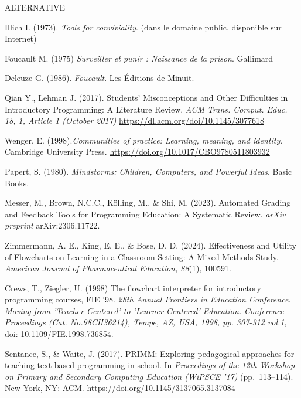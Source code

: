 \documentclass[11pt,a4paper]{article}
\begin{document}
\clearpage
ALTERNATIVE
\begin{thebibliography}{99}

 Illich I. (1973). \textit{Tools for conviviality}. (dans le domaine public, disponible sur Internet)

 Foucault M. (1975)  \textit{Surveiller et punir : Naissance de la prison}.  Gallimard

 Deleuze G. (1986). \textit{Foucault}. Les Éditions de Minuit.

Qian Y., Lehman J. (2017). Students’ Misconceptions and Other Difficulties in Introductory Programming: A Literature Review. \textit{ACM Trans. Comput. Educ. 18, 1, Article 1 (October 2017)} \url{https://dl.acm.org/doi/10.1145/3077618}

Wenger, E. (1998).\textit{Communities of practice: Learning, meaning, and identity}. Cambridge University Press. \url{https://doi.org/10.1017/CBO9780511803932}

 Papert, S. (1980). \textit{Mindstorms: Children, Computers, and Powerful Ideas}. Basic Books.

Messer, M., Brown, N.C.C., Kölling, M., \& Shi, M. (2023). Automated Grading 
and Feedback Tools for Programming Education: A Systematic Review. \textit{arXiv preprint} 
arXiv:2306.11722.

 Zimmermann, A. E., King, E. E., \& Bose, D. D. (2024). Effectiveness 
and Utility of Flowcharts on Learning in a Classroom Setting: A Mixed-Methods Study. 
\textit{American Journal of Pharmaceutical Education, 88}(1), 100591.


Crews, T., Ziegler, U. (1998) The flowchart interpreter for introductory programming courses, FIE '98. \textit{28th Annual Frontiers in Education Conference. Moving from 'Teacher-Centered' to 'Learner-Centered' Education. Conference Proceedings (Cat. No.98CH36214), Tempe, AZ, USA, 1998, pp. 307-312 vol.1}, \url{doi: 10.1109/FIE.1998.736854}.


Sentance, S., \& Waite, J. (2017).
PRIMM: Exploring pedagogical approaches for teaching text-based programming in school.
In \textit{Proceedings of the 12th Workshop on Primary and Secondary Computing Education (WiPSCE '17)} (pp.~113--114).
New York, NY: ACM.
https://doi.org/10.1145/3137065.3137084


\end{thebibliography}
\end{document}
